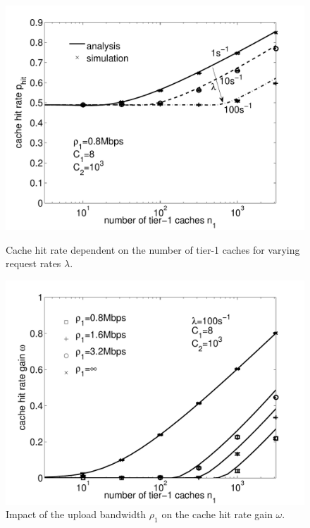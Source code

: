 \begin{figure}[bt]
\begin{minipage}[t]{0.49\textwidth}
  \centering
  \includegraphics[width=\textwidth]{hierarchical/analyticbw/figures/hwc_C8C1e3_l0}
  \caption{Cache hit rate dependent on the number of tier-1 caches for varying request rates $\lambda$.}
  \label{fig:hwc_C8C1e3_l}
\end{minipage}
\hspace{0.01\textwidth}
\begin{minipage}[t]{0.49\textwidth}
  \centering
  \includegraphics[width=\textwidth]{hierarchical/analyticbw/figures/hwc_C8l100_gain}
  \caption{Impact of the upload bandwidth $\rho_1$ on the cache hit rate gain $\omega$.}
  \label{fig:hwc_C8l100_gain}
  \end{minipage}
\end{figure}

